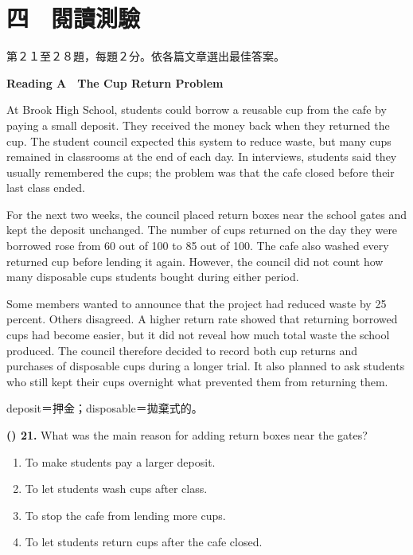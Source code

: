 \documentclass[11pt,a4paper]{article}
\newenvironment{qblock}{\par\vspace{3pt}\noindent\begin{minipage}{\linewidth}}{\end{minipage}\par\vspace{4pt}}
\begin{document}
\newpage
\section*{四　閱讀測驗}
{\small 第２１至２８題，每題２分。依各篇文章選出最佳答案。
\par\smallskip
}
\textbf{Reading A　The Cup Return Problem}\par\smallskip
At Brook High School, students could borrow a reusable cup from the cafe by paying a small deposit. They received the money back when they returned the cup. The student council expected this system to reduce waste, but many cups remained in classrooms at the end of each day. In interviews, students said they usually remembered the cups; the problem was that the cafe closed before their last class ended.
\par\smallskip
For the next two weeks, the council placed return boxes near the school gates and kept the deposit unchanged. The number of cups returned on the day they were borrowed rose from 60 out of 100 to 85 out of 100. The cafe also washed every returned cup before lending it again. However, the council did not count how many disposable cups students bought during either period.
\par\smallskip
Some members wanted to announce that the project had reduced waste by 25 percent. Others disagreed. A higher return rate showed that returning borrowed cups had become easier, but it did not reveal how much total waste the school produced. The council therefore decided to record both cup returns and purchases of disposable cups during a longer trial. It also planned to ask students who still kept their cups overnight what prevented them from returning them.
\par\smallskip
{\small deposit＝押金；disposable＝拋棄式的。
\par\smallskip
}
\begin{qblock}
\textbf{(\hspace{0.6cm}) 21.} What was the main reason for adding return boxes near the gates?
\par
\begin{enumerate}[label=(\Alph*),leftmargin=1.0cm,nosep,topsep=2pt]
\item To make students pay a larger deposit.
\item To let students wash cups after class.
\item To stop the cafe from lending more cups.
\item To let students return cups after the cafe closed.
\end{enumerate}
\end{qblock}
\end{document}
